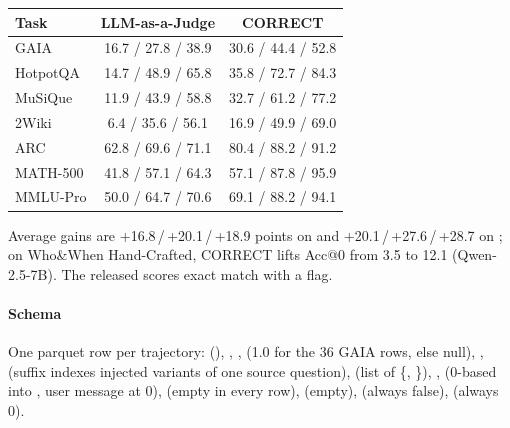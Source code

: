 \begin{center}\small
\begin{tabular}{@{}lcc@{}}\toprule
Task & LLM-as-a-Judge & CORRECT\\\midrule
GAIA & 16.7 / 27.8 / 38.9 & 30.6 / 44.4 / 52.8\\
HotpotQA & 14.7 / 48.9 / 65.8 & 35.8 / 72.7 / 84.3\\
MuSiQue & 11.9 / 43.9 / 58.8 & 32.7 / 61.2 / 77.2\\
2Wiki & 6.4 / 35.6 / 56.1 & 16.9 / 49.9 / 69.0\\
ARC & 62.8 / 69.6 / 71.1 & 80.4 / 88.2 / 91.2\\
MATH-500 & 41.8 / 57.1 / 64.3 & 57.1 / 87.8 / 95.9\\
MMLU-Pro & 50.0 / 64.7 / 70.6 & 69.1 / 88.2 / 94.1\\\bottomrule
\end{tabular}
\end{center}
Average gains are +16.8\,/\,+20.1\,/\,+18.9 points on  and +20.1\,/\,+27.6\,/\,+28.7 on ; on Who\&When Hand-Crafted, CORRECT lifts Acc@0 from 3.5 to 12.1 (Qwen-2.5-7B). The released  scores exact match with a  flag.

\paragraph{Schema} One parquet row per trajectory:  (), , ,  (1.0 for the 36 GAIA  rows, else null), ,  (suffix  indexes injected variants of one source question),  (list of \{, \}), ,  (0-based into , user message at 0),  (empty in every row),  (empty),  (always false),  (always 0).


